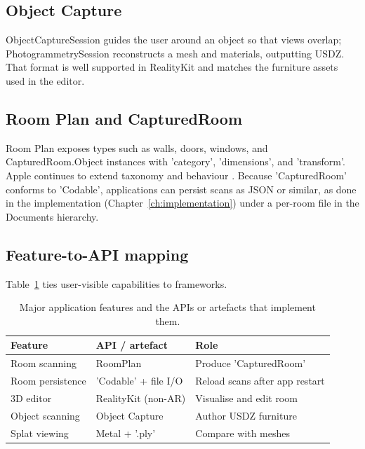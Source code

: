 \subsection{Object Capture}

ObjectCaptureSession guides the user around an object so that views overlap; PhotogrammetrySession reconstructs a mesh and materials, outputting USDZ. That format is well supported in RealityKit and matches the furniture assets used in the editor.

\subsection{Room Plan and CapturedRoom}

Room Plan exposes types such as walls, doors, windows, and CapturedRoom.Object instances with 'category', 'dimensions', and 'transform'. Apple continues to extend taxonomy and behaviour \cite{apple2024roomplan2}. Because 'CapturedRoom' conforms to 'Codable', applications can persist scans as JSON or similar, as done in the implementation (Chapter~\ref{ch:implementation}) under a per-room file in the Documents hierarchy.

\subsection{Feature-to-API mapping}

Table~\ref{tab:feature_api} ties user-visible capabilities to frameworks.

\begin{table}[h]
\centering
\caption{Major application features and the APIs or artefacts that implement them.}
\label{tab:feature_api}
\begin{tabular}{|l|l|p{}|}
\hline
\textbf{Feature} & \textbf{API / artefact} & \textbf{Role} \\
\hline
Room scanning & RoomPlan & Produce 'CapturedRoom' \\
\hline
Room persistence & 'Codable' + file I/O & Reload scans after app restart \\
\hline
3D editor & RealityKit (non-AR) & Visualise and edit room \\
\hline
Object scanning & Object Capture & Author USDZ furniture \\
\hline
Splat viewing & Metal + '.ply' & Compare with meshes \\
\hline
\end{tabular}
\end{table}

